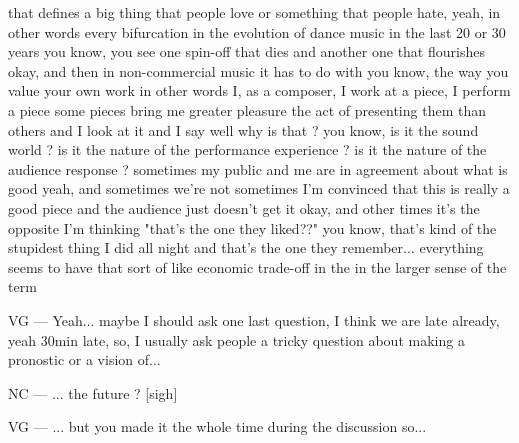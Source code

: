 that defines a big thing that people love or something that people hate, yeah, in other words every bifurcation in the evolution of dance music in the last 20 or 30 years you know, you see one spin-off that dies and another one that flourishes okay, and then in non-commercial music it has to do with you know, the way you value your own work in other words I, as a composer, I work at a piece, I perform a piece some pieces bring me greater pleasure the act of presenting them than others and I look at it and I say well why is that ? you know, is it the sound world ? is it the nature of the performance experience ? is it the nature of the audience response ? sometimes my public and me are in agreement about what is good yeah, and sometimes we're not sometimes I'm convinced that this is really a good piece and the audience just doesn't get it okay, and other times it's the opposite I'm thinking "that's the one they liked??" you know, that's kind of the stupidest thing I did all night and that's the one they remember... everything seems to have that sort of like economic trade-off in the in the larger sense of the term 

VG — Yeah... maybe I should ask one last question, I think we are late already, yeah 30min late, so, I usually ask people a tricky question about making a pronostic or a vision of... 

NC — ... the future ? [sigh] 

VG — ... but you made it the whole time  during the discussion so... 

